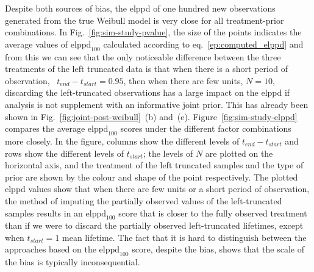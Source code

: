 Despite both sources of bias, the elppd of one hundred new observations generated from the true Weibull model is very close for all treatment-prior combinations. In Fig.~\ref{fig:sim-study-pvalue}, the size of the points indicates the average values of $\text{elppd}_{100}$ calculated according to eq.~\eqref{ep:computed_elppd} and from this we can see that the only noticeable difference between the three treatments of the left truncated data is that when there is a short period of observation,  $t_{end} - t_{start} = 0.95$, then when there are few units, $N = 10$, discarding the left-truncated observations has a large impact on the elppd if analysis is not supplement with an informative joint prior. This has already been shown in Fig.~\ref{fig:joint-post-weibull}~(b) and~(e). Figure~\ref{fig:sim-study-elppd} compares the average $\text{elppd}_{100}$ scores under the different factor combinations more closely. In the figure, columns show the different levels of $t_{end} - t_{start}$ and rows show the different levels of $t_{start}$; the levels of $N$ are plotted on the horizontal axis, and the treatment of the left truncated samples and the type of prior are shown by the colour and shape of the point respectively. The plotted elppd values show that when there are few units or a short period of observation, the method of imputing the partially observed values of the left-truncated samples results in an $\text{elppd}_{100}$ score that is closer to the fully observed treatment than if we were to discard the partially observed left-truncated lifetimes, except when $t_{start} = 1$ mean lifetime. The fact that it is hard to distinguish between the approaches based on the $\text{elppd}_{100}$ score, despite the bias, shows that the scale of the bias is typically inconsequential.

